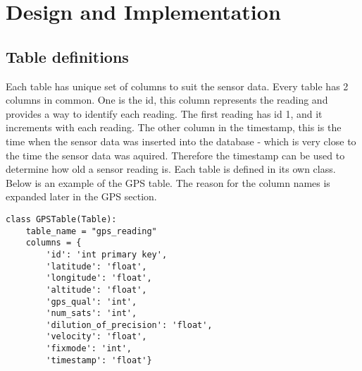 \section{Design and Implementation}

\subsection{Table definitions}
Each table has unique set of columns to suit the sensor data.
Every table has 2 columns in common. One is the id, this column represents the reading and provides a way to identify each reading. The first reading has id 1, and it increments with each reading. The other column in the timestamp, this is the time when the sensor data was inserted into the database - which is very close to the time the sensor data was aquired. Therefore the timestamp can be used to determine how old a sensor reading is.
\newline
Each table is defined in its own class.
Below is an example of the GPS table. The reason for the column names is expanded later in the GPS section.
\begin{lstlisting}[style=custompython]
class GPSTable(Table):
    table_name = "gps_reading"
    columns = {
        'id': 'int primary key',
        'latitude': 'float',
        'longitude': 'float',
        'altitude': 'float',
        'gps_qual': 'int',
        'num_sats': 'int',
        'dilution_of_precision': 'float',
        'velocity': 'float',
        'fixmode': 'int',
        'timestamp': 'float'}
\end{lstlisting}


